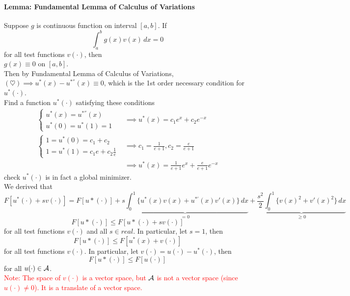 \documentclass[11pt]{article}
\begin{document}
\paragraph{Lemma: Fundamental Lemma of Calculus of Variations}
Suppose $g$ is continuous function on interval $[a,b]$. If
$$\int_a^b g(x)v(x) \, dx = 0$$ for all test functions $v(\cdot)$, then \\
$g(x) \equiv 0$ on $[a,b]$.\\
Then by Fundamental Lemma of Calculus of Variations, $(\heartsuit) \implies u^*(x) - u^{*''}(x) \equiv 0$, which is the 1st order necessary condition for $u^*(\cdot)$. \\
 Find a function $u^*(\cdot)$ satisfying these conditions
\begin{align}
\begin{cases}
	u^*(x) = u^{*''}(x) \\
	u^*(0) = u^*(1) = 1
\end{cases} &\implies u^*(x) = c_1e^x + c_2e^{-x} \\
\begin{cases}
	1 = u^*(0) = c_1 + c_2 \\
	1 = u^*(1) = c_1e + c_2 \frac{1}{e}
\end{cases} &\implies c_1 = \frac{1}{e + 1}, c_2 = \frac{e}{e+1} \\
&\implies u^*(x) = \frac{1}{e + 1} e^x + \frac{e}{e+1}e^{-x}
\end{align}
 check $u^*(\cdot)$ is in fact a global minimizer. \\
We derived that 
$$F[u^*(\cdot) + sv(\cdot)] = F[u*(\cdot)] + \underbrace{s\int_0^1 \{ u^*(x)v(x) + u^{*'}(x)v'(x)\} \, dx}_{=0} + \underbrace{\frac{s^2}{2} \int_0^1 \{ v(x)^2 + v'(x)^2 \} \, dx}_{\geq 0}$$
$$F[u*(\cdot)] \leq F[u*(\cdot) + sv(\cdot)]$$
for all test functions $v(\cdot)$ and all $s \in real$. In particular, let $s = 1$, then\\
$$F[u*(\cdot)] \leq F[u^*(x) + v(\cdot)]$$
for all test functions $v(\cdot)$. In particular, let $v(\cdot) = u(\cdot) - u^*(\cdot)$, then
$$F[u*(\cdot)] \leq F[u(\cdot)]$$ for all $u(\cdot) \in \mathcal{A}$. \\
\textcolor{red}{Note: The space of $v(\cdot)$ is a vector space, but $\mathcal{A}$ is not a vector space (since $u(\cdot) \neq 0$). It is a translate of a vector space.}
\end{document}
